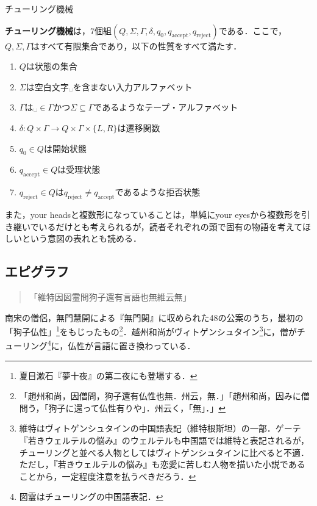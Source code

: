 \documentclass[10pt, a5paper, twoside]{ltjsarticle}
\begin{document}
        \begin{dfn}{チューリング機械}{}

			\textbf{チューリング機械}は，7個組$(Q, \Sigma, \Gamma, \delta, q_0, q_{\mathrm{accept}}, q_{\mathrm{reject}})$である．ここで，$Q, \Sigma, \Gamma$はすべて有限集合であり，以下の性質をすべて満たす．

			\begin{enumerate}
				\item $Q$は状態の集合

				\item $\Sigma$は空白文字$␣$を含まない入力アルファベット

				\item $\Gamma$は$␣ \in \Gamma$かつ$\Sigma \subseteq \Gamma$であるようなテープ・アルファベット

				\item $\delta : Q \times \Gamma \to Q \times \Gamma \times \{ L, R \}$は遷移関数

				\item $q_0 \in Q$は開始状態

				\item $q_{\mathrm{accept}} \in Q$は受理状態

				\item $q_{\mathrm{reject}} \in Q$は$q_{\mathrm{reject}} \neq q_{\mathrm{accept}}$であるような拒否状態
			\end{enumerate}

		\end{dfn}

        また，your headsと複数形になっていることは，単純にyour eyesから複数形を引き継いでいるだけとも考えられるが，読者それぞれの頭で固有の物語を考えてほしいという意図の表れとも読める．

        \subsection{エピグラフ}\label{ed}

            \begin{quote}
                「維特因図霊問狗子還有言語也無維云無」
            \end{quote}

            南宋の僧侶，無門慧開による『無門関』に収められた48の公案のうち，最初の「狗子仏性」\footnote{夏目漱石『夢十夜』の第二夜にも登場する．}をもじったもの\footnote{「趙州和尚，因僧問，狗子還有仏性也無．州云，無．」「趙州和尚，因みに僧問う，「狗子に還って仏性有りや」．州云く，「無」．」\cite{mumonkan}}．越州和尚がヴィトゲンシュタイン\footnote{維特はヴィトゲンシュタインの中国語表記（維特根斯坦）の一部．ゲーテ『若きウェルテルの悩み』のウェルテルも中国語では維特と表記されるが，チューリングと並べる人物としてはヴィトゲンシュタインに比べると不適．ただし，『若きウェルテルの悩み』も恋愛に苦しむ人物を描いた小説であることから，一定程度注意を払うべきだろう．}に，僧がチューリング\footnote{図霊はチューリングの中国語表記．}に，仏性が言語に置き換わっている．
\end{document}
